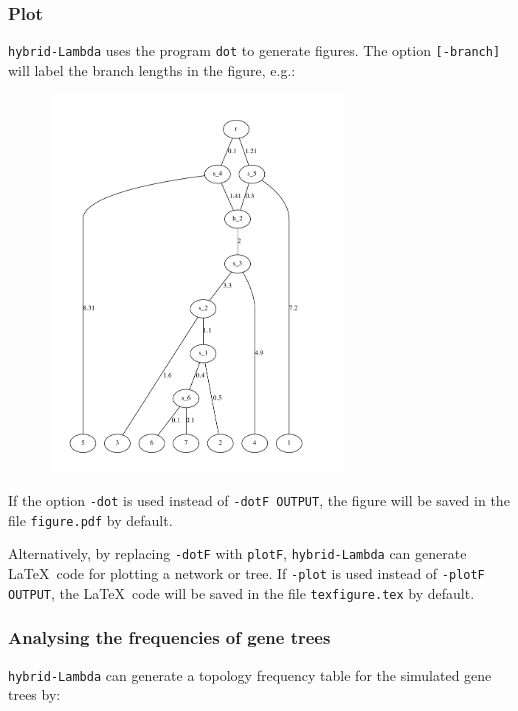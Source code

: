 \subsubsection{Plot}
{\tt hybrid-Lambda} uses the program {\tt dot} to generate figures. The option {\tt [-branch]} will label the branch lengths in the figure, e.g.:
\begin{center}
\includegraphics[width=10cm,height=10cm]{branch.pdf}
\end{center}
If the option {\tt -dot} is used instead of {\tt -dotF OUTPUT}, the figure will be saved in the file {\tt figure.pdf} by default.

Alternatively, by replacing {\tt -dotF} with {\tt plotF}, {\tt hybrid-Lambda} can generate \LaTeX\ code for plotting a network or tree.
If {\tt -plot} is used instead of {\tt -plotF OUTPUT}, the \LaTeX\ code will be saved in the file {\tt texfigure.tex} by default.

\subsubsection{Analysing the frequencies of gene trees}
{\tt hybrid-Lambda} can generate a topology frequency table for the simulated gene trees by:

